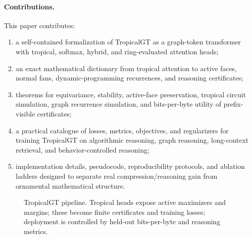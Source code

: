 \documentclass[11pt]{article}
\newcommand{\bits}{\operatorname{bits\mbox{-}per\mbox{-}byte}}
\begin{document}
\paragraph{Contributions.}
This paper contributes:
\begin{enumerate}
\item a self-contained formalization of TropicalGT as a graph-token transformer with tropical, softmax, hybrid, and ring-evaluated attention heads;
\item an exact mathematical dictionary from tropical attention to active faces, normal fans, dynamic-programming recurrences, and reasoning certificates;
\item theorems for equivariance, stability, active-face preservation, tropical circuit simulation, graph recurrence simulation, and bits-per-byte utility of prefix-visible certificates;
\item a practical catalogue of losses, metrics, objectives, and regularizers for training TropicalGT on algorithmic reasoning, graph reasoning, long-context retrieval, and behavior-controlled reasoning;
\item implementation details, pseudocode, reproducibility protocols, and ablation ladders designed to separate real compression/reasoning gain from ornamental mathematical structure.
\end{enumerate}

\begin{figure}[h]
\centering
{}
\caption{TropicalGT pipeline.  Tropical heads expose active maximizers and margins; these become finite certificates and training losses; deployment is controlled by held-out bits-per-byte and reasoning metrics.}
\end{figure}
\end{document}
